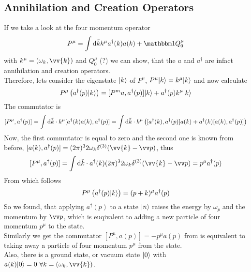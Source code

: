 \subsection{Annihilation and Creation Operators}
If we take a look at the four momentum operator
\[P^\mu = \int \dd \tilde{k} k^\mu a^\dagger(k) a(k) + \ehm Q_0^\mu\]
with $k^\mu = (\omega_k, \vv{k})$ and $Q_0^\mu$ (?) we can show, that the $a$ and $a^\dagger$ are infact annihilation and creation operators.\\
Therefore, lets consider the eigenstate $|k\rangle$ of $P^\mu$, $P^\mu|k\rangle = k^\mu|k\rangle$ and now calculate
\[ P^\mu\left( a^\dagger(p) |k\rangle\right) = [ P^mu, a^\dagger(p)]|k\rangle + a^\dagger(p) k^\mu|k\rangle\]
The commutator is
\[ [P^\mu, a^\dagger(p)] = \int {\rm d} \tilde{k}\cdot k^\mu [ a^\dagger(k)a(k), a^\dagger(p)] = \int {\rm d} \tilde{k}\cdot k^\mu \left([ a^\dagger(k), a^\dagger(p)]a(k) + a^\dagger(k) [a(k), a^\dagger(p)]\right)\]
Now, the first commutator is equal to zero and the second one is known from before, $[a(k), a^\dagger(p)] = (2\pi)^3 2 \omega_k \delta^{(3)} (\vv{k} - \vp)$, thus
\[ [P^\mu, a^\dagger(p)] = \int \dd \tilde{k}\cc a^\dagger(k)(2\pi)^3 2 \omega_k \delta^{(3)}(\vv{k}-\vp) = p^\mu a^\dagger(p)\]
From which follows
\[ P^\mu \left( a^\dagger(p) |k\rangle\right) = ( p + k )^\mu a^\dagger(p)\]
So we found, that applying $a^\dagger(p)$ to a state $|n\rangle$ raises the energy by $\omega_p$ and the momentum by $\vp$, which is euqivalent to adding a new particle of four momentum $p^\mu$ to the state.\\
Similarly we get the commutator $[P^\mu, a(p)] = - p^\mu a(p)$ from is equivalent to taking away a particle of four momentum $p^\mu$ from the state.\\
Also, there is a ground state, or vacuum state $|0\rangle$ with $a(k) |0\rk = 0 ~\forall k = (\omega_k, \vv{k})$.


